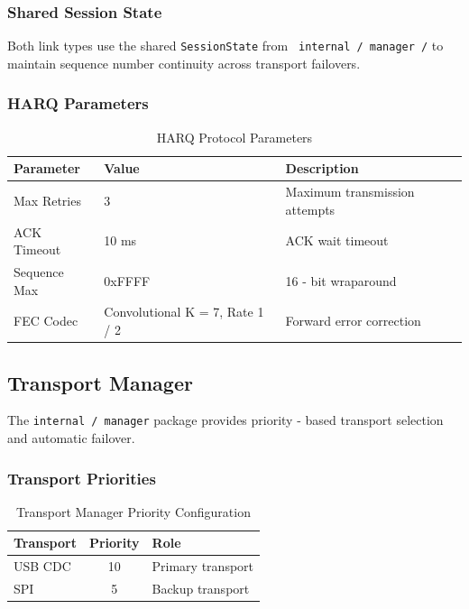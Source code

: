 \subsubsection{Shared Session State}

Both link types use the shared \texttt{SessionState} from \texttt{
    internal / manager /} to maintain sequence number continuity across
    transport failovers.

\subsubsection{HARQ Parameters
}

\begin{table}[H]
\centering
\caption{HARQ Protocol Parameters}
\label{tab:harq-params}
\begin{tabular} { | l | l | l |}
\hline
\textbf{Parameter} & \textbf{Value} & \textbf{Description}
\\
\hline Max Retries & 3 &Maximum transmission attempts \\
ACK Timeout & 10 ms
        &ACK wait timeout \\
Sequence Max & 0xFFFF & 16 -
    bit wraparound \\
FEC Codec &Convolutional K = 7,
                                              Rate 1 / 2 &
                                                  Forward error correction \\
\hline
\end{tabular}
\end{table}

\subsection{Transport Manager}

    The \texttt{internal / manager} package provides priority -
    based transport selection and automatic failover.

\subsubsection{Transport Priorities
}

\begin{table}[H]
\centering
\caption{Transport Manager Priority Configuration}
\label{tab:transport-priorities}
\begin{tabular} { | l | c | l |}
\hline
\textbf{Transport} & \textbf{Priority} & \textbf{Role}
\\
\hline USB CDC & 10 & Primary transport \\
SPI & 5 & Backup transport \\
\hline
\end{tabular}
\end{table}

